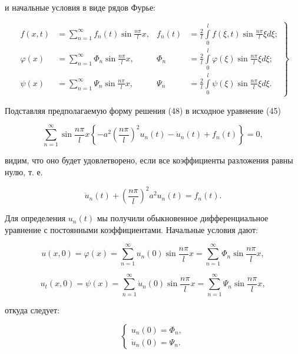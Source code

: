 \documentclass{article}
\begin{document}
\noindent
и начальные условия в виде рядов Фурье:

\begin{equation}
    \left.
    \begin{aligned}
        f(x, t) &= \sum_{n=1}^{\infty} f_n(t) \sin{\frac{n\pi}{l} x}, & f_n(t) &= \frac{2}{l} \int\limits_{0}^{l} f(\xi, t) \sin{\frac{n\pi}{l} \xi} d\xi; \\
        \varphi(x) &= \sum_{n=1}^{\infty} \Phi_n \sin{\frac{n\pi}{l} x}, & \Phi_n &= \frac{2}{l} \int\limits_{0}^{l} \varphi(\xi) \sin{\frac{n\pi}{l} \xi} d\xi; \\
        \psi(x) &= \sum_{n=1}^{\infty} \Psi_n \sin{\frac{n\pi}{l} x}, & \Psi_n &= \frac{2}{l} \int\limits_{0}^{l} \psi(\xi) \sin{\frac{n\pi}{l} \xi} d\xi.
    \end{aligned}
    \right\} \tag{49}
\end{equation}

\noindent
Подставляя предполагаемую форму решения (48) в исходное уравнение (45)

\begin{equation*}
    \sum_{n=1}^{\infty} \sin{\frac{n\pi}{l} x} \left\{ -a^2 \left(\frac{n\pi}{l}\right)^2 u_n(t) - \ddot{u}_n(t) + f_n(t) \right\} = 0,
\end{equation*}

\noindent
видим, что оно будет удовлетворено, если все коэффициенты разложения равны нулю, т. е.

\begin{equation}
    \ddot{u}_n(t) + \left(\frac{n\pi}{l}\right)^2 a^2 u_n(t) = f_n(t). \tag{50}
\end{equation}

\noindent
Для определения $u_n(t)$ мы получили обыкновенное дифференциальное уравнение с постоянными коэффициентами. Начальные условия дают:

\begin{equation*}
    u(x, 0) = \varphi(x) = \sum_{n=1}^{\infty} u_n(0) \sin{\frac{n\pi}{l} x} = \sum_{n=1}^{\infty} \Phi_n \sin{\frac{n\pi}{l} x},
\end{equation*}

\begin{equation*}
    u_t(x, 0) = \psi(x) = \sum_{n=1}^{\infty} \dot{u}_n(0) \sin{\frac{n\pi}{l} x} = \sum_{n=1}^{\infty} \Psi_n \sin{\frac{n\pi}{l} x},
\end{equation*}

\noindent
откуда следует:

\begin{equation}
    \begin{cases}
        u_n(0) = \Phi_n, \\
        \dot{u}_n(0) = \Psi_n.
    \end{cases} \tag{51}
\end{equation}
\end{document}
